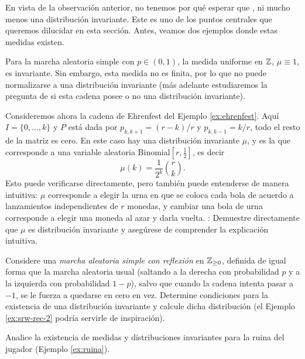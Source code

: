 En vista de la observación anterior, no tenemos por qué esperar que , ni mucho menos una distribución invariante.
Este es uno de los puntos centrales que queremos dilucidar en esta sección.
Antes, veamos dos ejemplos donde estas medidas existen.

\begin{ex}\label{ex:srw-1-inv}
Para la marcha aleatoria simple con $p\in(0,1)$, la medida uniforme en $\mathbb{Z}$, $\mu\equiv1$, es invariante.
Sin embargo, esta medida no es finita, por lo que no puede normalizarse a una distribución invariante (más adelante estudiaremos la pregunta de si esta cadena posee o no una distribución invariante).
\end{ex}

\begin{ex}
Consideremos ahora la cadena de Ehrenfest del Ejemplo \ref{ex:ehrenfest}.
Aquí $I=\{0,\dotsc,k\}$ y $P$ está dada por $p_{k,k+1}=(r-k)/r$ y $p_{k,k-1}=k/r$, todo el resto de la matriz es cero.
En este caso hay una distribución invariante $\mu$, y es la que corresponde a una variable aleatoria Binomial$[r,\frac12]$, es decir
\[\mu(k)=\frac1{2^k}\binom{r}{k}.\]
Esto puede verificarse directamente, pero también puede entenderse de manera intuitiva: $\mu$ corresponde a elegir la urna en que se coloca cada bola de acuerdo a lanzamientos independientes de $r$ monedas, y cambiar una bola de urna corresponde a elegir una moneda al azar y darla vuelta.
\uexer: Demuestre directamente que $\mu$ es distribución invariante y asegúrese de comprender la explicación intuitiva.
\end{ex}

\begin{exer}
Considere una \emph{marcha aleatoria simple con reflexión} en $\mathbb{Z}_{\geq0}$, definida de igual forma que la marcha aleatoria usual (saltando a la derecha con probabilidad $p$ y a la izquierda con probabilidad $1-p$), salvo que cuando la cadena intenta pasar a $-1$, se le fuerza a quedarse en cero en vez.
Determine condiciones para la existencia de una distribución invariante y calcule dicha distribución (el Ejemplo \ref{ex:srw-rec-2} podría servirle de inspiración).
\end{exer}

\begin{exer}
Analice la existencia de medidas y distribuciones invariantes para la ruina del jugador (Ejemplo \ref{ex:ruina}).
\end{exer}


